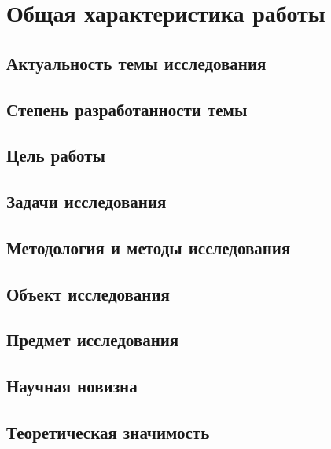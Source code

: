 
\section*{Общая характеристика работы}

\subsection*{Актуальность темы исследования}
\actualityText

\subsection*{Степень разработанности темы}
\degreeText

\subsection*{Цель работы}
\aimText

\subsection*{Задачи исследования}
\tasksText

\subsection*{Методология и методы исследования}
\methodsText

\subsection*{Объект исследования}
\objectText

\subsection*{Предмет исследования}
\subjectText

\subsection*{Научная новизна}
\noveltyText

\subsection*{Теоретическая значимость}
\theoreticalText

